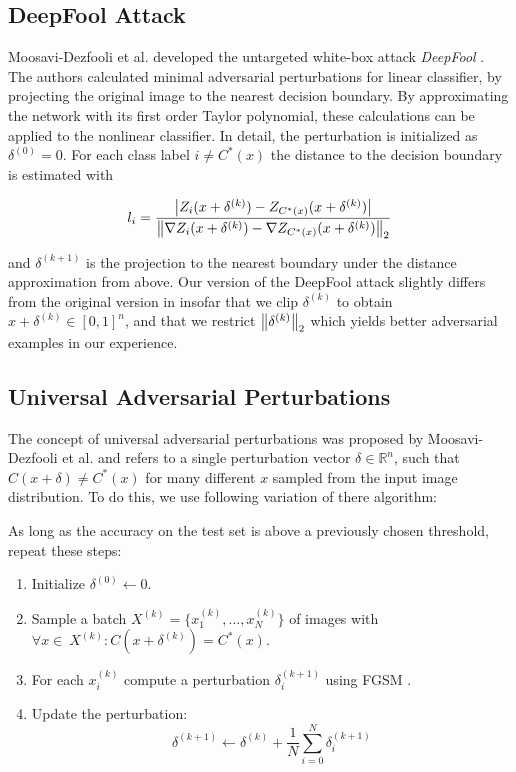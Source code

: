 \subsection{DeepFool Attack}
Moosavi-Dezfooli et al. developed the untargeted white-box attack \emph{DeepFool} \cite{deepfool}.
The authors calculated minimal adversarial perturbations for linear classifier, by projecting the original image to the nearest decision boundary. By approximating the network with its first order Taylor polynomial, these calculations can be applied to the nonlinear classifier.
In detail, the perturbation is initialized as $\delta^{(0)} = 0$. For each class label $i \neq C^*(x)$ the distance to the decision boundary is estimated with

\begin{equation}
l_i = 
\frac{
	\left \lvert Z_i(x + \delta^{(k)}) - Z_{C^*(x)}(x + \delta^{(k)}) \right \rvert
}
{
	\left \lVert \nabla Z_i(x + \delta^{(k)}) - \nabla Z_{C^*(x)}(x + \delta^{(k)}) \right \rVert _2
}
\end{equation}


and $\delta^{(k+1)}$ is the projection to the nearest boundary under the distance approximation from above. Our version of the DeepFool attack slightly differs from the original version in \cite{deepfool} insofar that we clip $\delta^{(k)}$ to obtain $x + \delta^{(k)} \in [0,1]^n$, and that we restrict $\left \lVert \delta^{(k)} \right \rVert _2$ which yields better adversarial examples in our experience.

\subsection{Universal Adversarial Perturbations}
The concept of universal adversarial perturbations was proposed by Moosavi-Dezfooli et al. \cite{universal} and refers to a single perturbation vector $\delta \in \mathbb{R}^n$, such that $C(x + \delta) \neq C^*(x)$ for many different $x$ sampled from the input image distribution.
To do this, we use following variation of there algorithm:

As long as the accuracy on the test set is above a previously chosen threshold, repeat these steps:
\begin{enumerate}
	\item Initialize $\delta^{(0)} \gets 0$.
	\item Sample a batch $X^{(k)} = \{x_1^{(k)}, ..., x_N^{(k)}\}$ of images with $\forall x \in\ X^{(k)}:  C(x + \delta^{(k)}) = C^*(x)$.
	\item For each $x_i^{(k)}$ compute a perturbation $\delta_i^{(k+1)}$ using FGSM \cite{fgsm}.
	\item Update the perturbation: $$\delta^{(k+1)} \gets \delta^{(k)} + \frac{1}{N} \sum\limits_{i=0}^N \delta_i^{(k+1)}$$
\end{enumerate}

